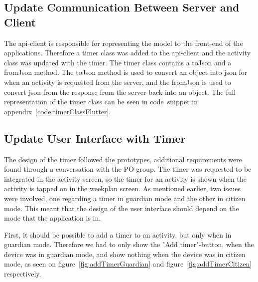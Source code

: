 \subsection{Update Communication Between Server and Client}
The api-client is responsible for representing the model to the front-end of the applications. Therefore a timer class was added to the api-client and the activity class was updated with the timer. The timer class contains a toJson and a fromJson method. The toJson method is used to convert an object into json for when an activity is requested from the server, and the fromJson is used to convert json from the response from the server back into an object. The full representation of the timer class can be seen in code~snippet in appendix~\ref{code:timerClassFlutter}.

\subsection{Update User Interface with Timer}
The design of the timer followed the prototypes, additional requirements were found through a conversation with the PO-group. The timer was requested to be integrated in the activity screen, so the timer for an activity is shown when the activity is tapped on in the weekplan screen. As mentioned earlier, two issues were involved, one regarding a timer in guardian mode and the other in citizen mode. This meant that the design of the user interface should depend on the mode that the application is in. 

First, it should be possible to add a timer to an activity, but only when in guardian mode. Therefore we had to only show the "Add timer"-button, when the device was in guardian mode, and show nothing when the device was in citizen mode, as seen on figure~\ref{fig:addTimerGuardian} and figure~\ref{fig:addTimerCitizen} respectively. 

